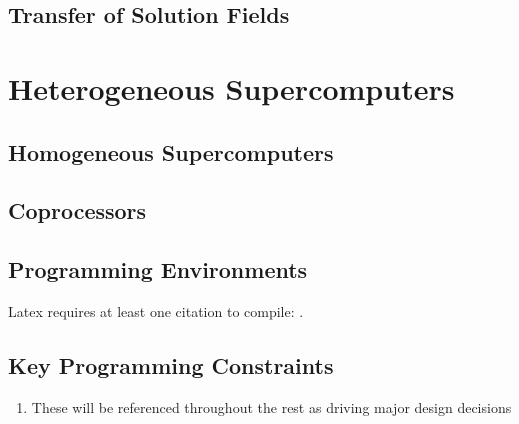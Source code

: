 \subsection{Transfer of Solution Fields}

\section{Heterogeneous Supercomputers}

\subsection{Homogeneous Supercomputers}

\subsection{Coprocessors}

\subsection{Programming Environments}

Latex requires at least one citation to
compile: \cite{edwards2013kokkos}.

\subsection{Key Programming Constraints}

\begin{enumerate}
\item These will be referenced throughout the rest
as driving major design decisions
\end{enumerate}

